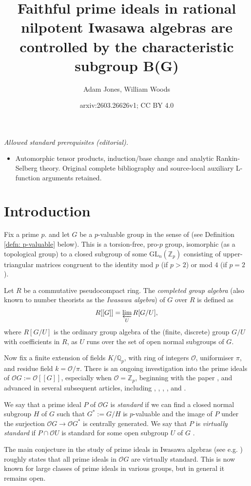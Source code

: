 \documentclass[12pt,a4paper]{article}
\title{Faithful prime ideals in rational nilpotent Iwasawa algebras are controlled by the characteristic subgroup B(G)}
\author{Adam Jones, William Woods}
\date{arxiv:2603.26626v1; CC BY 4.0}
\theoremstyle{definition}
\theoremstyle{remark}
\theoremstyle{custthm}
\renewcommand{\O}{\mathcal{O}}
\begin{document}
\maketitle
\noindent\textit{Allowed standard prerequisites (editorial).}\begin{itemize}
\item Automorphic tensor products, induction/base change and analytic Rankin-Selberg theory. Original complete bibliography and source-local auxiliary L-function arguments retained.
\end{itemize}\medskip
\section{Introduction}

Fix a prime $p$. and let $G$ be a $p$-valuable group in the sense of \cite{Laz65} (see Definition \ref{defn: p-valuable} below). This is a torsion-free, pro-$p$ group, isomorphic (as a topological group) to a closed subgroup of some $\mathrm{GL}_n(\mathbb{Z}_p)$ consisting of upper-triangular matrices congruent to the identity mod $p$ (if $p > 2$) or mod $4$ (if $p = 2$).

Let $R$ be a commutative pseudocompact ring. The \emph{completed group algebra} (also known to number theorists as the \emph{Iwasawa algebra}) of $G$ over $R$ is defined as
$$R[[G]] = \varprojlim_U R[G/U],$$
where $R[G/U]$ is the ordinary group algebra of the (finite, discrete) group $G/U$ with coefficients in $R$, as $U$ runs over the set of open normal subgroups of $G$.

Now fix a finite extension of fields $K/\mathbb{Q}_p$, with ring of integers $\O$, uniformiser $\pi$, and residue field $k = \O/\pi$. There is an ongoing investigation into the prime ideals of $\O G := \O[[G]]$, especially when $\O = \mathbb{Z}_p$, beginning with the paper \cite{ArdBro06}, and advanced in several subsequent articles, including \cite{reflexive}, \cite{ardakovInv}, \cite{jones-abelian-by-procyclic}, \cite{jones-primitive-ideals},\cite{Munster} and \cite{Mann}.

We say that a prime ideal $P$ of $\O G$ is \emph{standard} if we can find a closed normal subgroup $H$ of $G$ such that $G^*:=G/H$ is $p$-valuable and the image of $P$ under the surjection $\O G\to \O G^*$ is centrally generated. We say that $P$ is \emph{virtually standard} if $P\cap \O U$ is standard for some open subgroup $U$ of $G$ \cite[Definition 1.1]{jones-primitive-ideals}. 

The main conjecture in the study of prime ideals in Iwasawa algebras (see e.g. \cite[Conjecture 1.2]{jones-primitive-ideals}) roughly states that all prime ideals in $\O G$ are virtually standard. This is now known for large classes of prime ideals in various groups, but in general it remains open.
\end{document}
